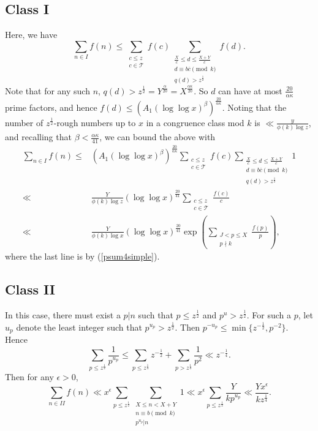 \documentclass{amsart}
\begin{document}
\subsection{Class I}
Here, we have
$$\sum_{n\in I}f(n)\leq \sum_{\substack{c\leq z \\ c\in \mathcal T
}}f(c)\sum_{\substack{\frac Xc\leq d\leq \frac{X+Y}{c} \\ d\equiv b\overline{c}\pmod k \\ q(d)>z^\frac 12}}f(d).$$
Note that for any such $n$, $q(d)>z^\frac 12=Y^{\frac{\alpha}{20}}=X^{\frac{\alpha\kappa}{20}}.$  So $d$ can have at most $\frac{20}{\alpha\kappa}$ prime factors, and hence $f(d)\leq \left(A_1(\log\log x)^\beta\right)^{\frac{20}{\alpha\kappa}}$.  Noting that the number of $z^\frac 12$-rough numbers up to $x$ in a congruence class mod $k$ is $\ll \frac{y}{\phi(k)\log z}$, and recalling that $\beta<\frac{\alpha\kappa}{41}$, we can bound the above with
\begin{align*}
\sum_{n\in I}f(n)\leq &\left(A_1(\log\log x)^\beta\right)^{\frac{20}{\alpha\kappa}}\sum_{\substack{c\leq z \\ c\in \mathcal T}}f(c)\sum_{\substack{\frac Xc\leq d\leq \frac{X+Y}{c} \\ d\equiv b\overline{c}\pmod k \\ q(d)>z^\frac 12}}1\\
\ll &\frac{Y}{\phi(k)\log z}\left(\log\log x\right)^{\frac{20}{41}}\sum_{\substack{c\leq z \\ c\in \mathcal T}}\frac{f(c)}{c}\\
\ll &\frac{Y}{\phi(k)\log x}\left(\log\log x\right)^{\frac{20}{41}}\exp\left(\sum_{\substack{J<p\leq X \\ p\nmid k}}\frac{f(p)}{p}\right),
\end{align*}
where the last line is by (\ref{psum4simple}).  


\subsection{Class II}
In this case, there must exist a $p|n$ such that $p\leq z^\frac 12$ and $p^u>z^\frac 12$.  For such a $p$, let $u_p$ denote the least integer such that $p^{u_p}>z^\frac 12$.  Then $p^{-u_p}\leq \min\{z^{-\frac 12},p^{-2}\}$.  Hence
$$\sum_{p\leq z^\frac 12}\frac{1}{p^{u_p}}\leq \sum_{p\leq z^\frac 14}z^{-\frac 12}+\sum_{p>z^\frac 14}\frac 1{p^2}\ll z^{-\frac 14}.$$
Then for any $\epsilon>0$,
$$\sum_{n\in II}f(n)\ll x^\epsilon\sum_{p\leq z^\frac 12}\sum_{\substack{X\leq n<X+Y \\ n\equiv b\pmod k \\ p^{u_p}|n }}1\ll x^\epsilon\sum_{p\leq z^\frac 12}\frac{Y}{kp^{u_p}}\ll \frac{Yx^\epsilon}{kz^{\frac 14}}.$$
\end{document}
